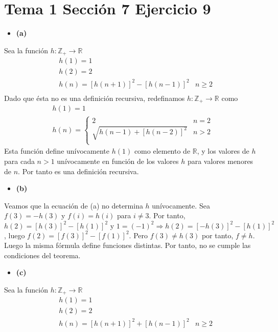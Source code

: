 \documentclass{article}
\begin{document}
\section{Tema 1 Sección 7 Ejercicio 9}
\begin{itemize}
\item \bf (a) \rm
\end{itemize}
Sea la función $h:\mathbb{Z}_{+}\rightarrow \mathbb{R}$
\begin{eqnarray}
& h(1)=1 &\nonumber\\
& h(2)=2 &\nonumber\\
& h(n)=\left[h(n+1)\right]^2-\left[h(n-1)\right]^2 & n\geq 2\nonumber\\
\end{eqnarray}
Dado que ésta no es una definición recursiva, redefinamos $h:\mathbb{Z}_{+}\rightarrow \mathbb{R}$ como
\begin{eqnarray}
& h(1)=1 &\nonumber\\
& h(n)=\begin{cases}
2 &  n=2 \nonumber\\
\sqrt{h(n-1)+\left[h(n-2)\right]^2} & n> 2 \nonumber\\
\end{cases}
\end{eqnarray}
Esta función define unívocamente $h(1)$ como elemento de $\mathbb{R}$, y los valores de $h$ para cada $n>1$ unívocamente en función de los valores $h$ para valores menores de $n$. Por tanto es una definición recursiva.
\begin{itemize}
\item \bf (b) \rm
\end{itemize}
Veamos que la ecuación de (a) no determina $h$ unívocamente. Sea $f(3)=-h(3)$ y $f(i)=h(i)$ para $i\neq 3$. Por tanto, $h(2)=[h(3)]^2-[h(1)]^2\text{ y }1=(-1)^2\Rightarrow h(2)=[-h(3)]^2-[h(1)]^2$, luego $f(2)=[f(3)]^2-[f(1)]^2$. Pero $f(3)\neq h(3)$ por tanto, $f\neq h$. Luego la misma fórmula define funciones distintas. Por tanto, no se cumple las condiciones del teorema.
\begin{itemize}
\item \bf (c) \rm
\end{itemize}
Sea la función $h:\mathbb{Z}_{+}\rightarrow \mathbb{R}$
\begin{eqnarray}
& h(1)=1 &\nonumber\\
& h(2)=2 &\nonumber\\
& h(n)=\left[h(n+1)\right]^2+\left[h(n-1)\right]^2 & n\geq 2\nonumber\\
\end{eqnarray}
\end{document}
